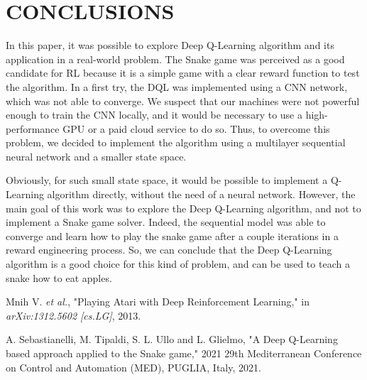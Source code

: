 \documentclass[conference]{IEEEtran}
\begin{document}
\section{CONCLUSIONS}

In this paper, it was possible to explore Deep Q-Learning algorithm and its application in a real-world problem. The Snake game was perceived as a good candidate for RL because it is a simple game with a clear reward function to test the algorithm. In a first try, the DQL was implemented using a CNN network, which was not able to converge. We suspect that our machines were not powerful enough to train the CNN locally, and it would be necessary to use a high-performance GPU or a paid cloud service to do so. Thus, to overcome this problem, we decided to implement the algorithm using a multilayer sequential neural network and a smaller state space.

Obviously, for such small state space, it would be possible to implement a Q-Learning algorithm directly, without the need of a neural network. However, the main goal of this work was to explore the Deep Q-Learning algorithm, and not to implement a Snake game solver. Indeed, the sequential model was able to converge and learn how to play the snake game after a couple iterations in a reward engineering process. So, we can conclude that the Deep Q-Learning algorithm is a good choice for this kind of problem, and can be used to teach a snake how to eat apples.

\begin{thebibliography}{99}
    Mnih V. \textit{et al.}, "Playing Atari with Deep Reinforcement Learning," in \textit{arXiv:1312.5602 [cs.LG]}, 2013.

    A. Sebastianelli, M. Tipaldi, S. L. Ullo and L. Glielmo, "A Deep Q-Learning based approach applied to the Snake game," 2021 29th Mediterranean Conference on Control and Automation (MED), PUGLIA, Italy, 2021.

\end{thebibliography}
\end{document}
